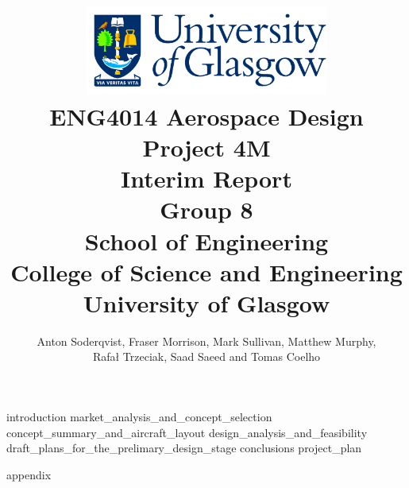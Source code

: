 \documentclass[12pt,titlepage,oneside]{book}
\author{Anton Soderqvist, Fraser Morrison, Mark Sullivan, Matthew Murphy, \\ Rafał Trzeciak, Saad Saeed and Tomas Coelho}
\begin{document}
\title{
\includegraphics[width=0.6\textwidth]{GlaLogo.pdf} \\
ENG4014 Aerospace Design Project 4M \\
Interim Report \\
Group 8  \\ 
\vspace{3em}
\normalsize{School of Engineering \\
College of Science and Engineering \\
University of Glasgow \\
}
}
\maketitle
\tableofcontents

{introduction}
{market_analysis_and_concept_selection}
{concept_summary_and_aircraft_layout}
{design_analysis_and_feasibility}
{draft_plans_for_the_prelimary_design_stage}
{conclusions}
{project_plan}




\appendix
{appendix}
\end{document}
